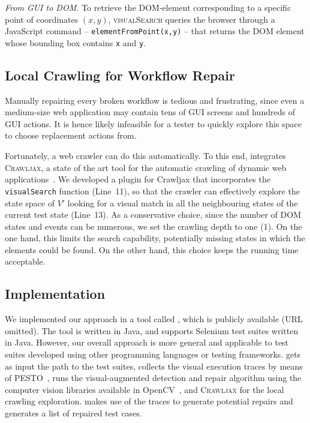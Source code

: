 \textit{From GUI to DOM.}
To retrieve the DOM-element corresponding to a specific point of coordinates $(x,y)$, \textsc{visualSearch} queries the browser through a JavaScript command -- \texttt{elementFromPoint(x,y)} -- that returns the DOM element whose bounding box contains \texttt{x} and \texttt{y}. 


\subsection{Local Crawling for Workflow Repair}

Manually repairing every broken workflow is tedious and frustrating, since even a medium-size web application may contain tens of GUI screens and hundreds of GUI actions. It is hence likely infeasible for a tester to quickly explore this space to choose replacement actions from.

Fortunately, a web crawler can do this automatically. To this end, \tool integrates \textsc{Crawljax}, a state of the art tool for the automatic crawling of dynamic web applications~\cite{mesbah:tweb12,mesbah:tse12}. We developed a plugin for Crawljax that incorporates the \texttt{visualSearch} function (Line~11), so that the crawler can effectively explore the state space of $V'$ looking for a visual match in all the neighbouring states of the current test state (Line~13). As a conservative choice, since the number of DOM states and events can be numerous, we set the crawling depth to one (1). On the one hand, this limits the search capability, potentially missing states in which the elements could be found. On the other hand, this choice keeps the running time acceptable.

\subsection{Implementation}\label{sec:implementation}

We implemented our approach in a tool called \tool, which is publicly available (URL omitted). 
The tool is written in Java, and supports Selenium test suites written in Java. However, our overall approach is more general and applicable to test suites developed using other programming languages or testing frameworks. 
\tool gets as input the path to the test suites, collects the visual execution traces by means of \textsc{PESTO}~\cite{2014-Stocco-SCAM}, runs the visual-augmented detection and repair algorithm using the computer vision libraries available in OpenCV~\cite{}, and \textsc{Crawljax} for the local crawling exploration. 
\tool makes use of the traces to generate potential repairs and generates a list of repaired test cases.







